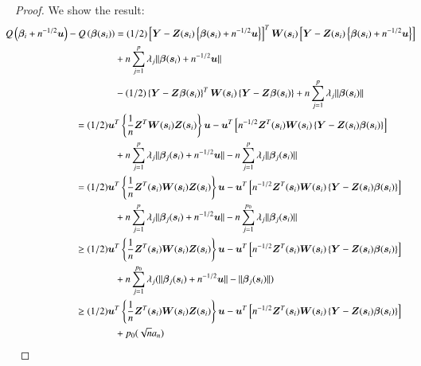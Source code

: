 \documentclass[authoryear, review, 11pt]{elsarticle}
\begin{document}
\begin{proof}
    We show the result:
    \begin{align}\label{eq:consistency}
      \mkern-18mu Q \left( \bm{\beta}_i + n^{-1/2} \bm{u} \right) - Q \left( \bm{\beta}(\bm{s}_i) \right) &= (1/2) \left[ \bm{Y} - \bm{Z}(\bm{s}_i) \left\{ \bm{\beta}(\bm{s}_i) + n^{-1/2} \bm{u} \right\} \right]^T \bm{W}(\bm{s}_i) \left[ \bm{Y} - \bm{Z}(\bm{s}_i) \left\{ \bm{\beta}(\bm{s}_i) + n^{-1/2} \bm{u} \right\} \right] \notag \\
      &+ n \sum_{j=1}^p \lambda_j \| \bm{\beta}(\bm{s}_i) + n^{-1/2} \bm{u} \| \notag \\
      &- (1/2) \left\{ \bm{Y} - \bm{Z} \bm{\beta}(\bm{s}_i) \right\}^T \bm{W}(\bm{s}_i) \left\{ \bm{Y} - \bm{Z} \bm{\beta}(\bm{s}_i) \right\} + n \sum_{j=1}^p \lambda_j \| \bm{\beta}(\bm{s}_i) \| \notag \\ 
      &\mkern-72mu= (1/2) \bm{u}^T \left\{ \frac{1}{n} \bm{Z}^T \bm{W}(\bm{s}_i) \bm{Z}(\bm{s}_i) \right\} \bm{u} - \bm{u}^T \left[ n^{-1/2} \bm{Z}^T(\bm{s}_i) \bm{W}(\bm{s}_i) \left\{ \bm{Y} - \bm{Z}(\bm{s}_i) \bm{\beta}(\bm{s}_i) \right\} \right] \notag \\
      &+ n \sum_{j=1}^p \lambda_j \|\bm{\beta}_j(\bm{s}_i) + n^{-1/2} \bm{u} \| - n \sum_{j=1}^p \lambda_j \| \bm{\beta}_j(\bm{s}_i) \| \notag \\
      &\mkern-72mu= (1/2) \bm{u}^T \left\{ \frac{1}{n} \bm{Z}^T(\bm{s}_i) \bm{W}(\bm{s}_i) \bm{Z}(\bm{s}_i) \right\} \bm{u} - \bm{u}^T \left[ n^{-1/2} \bm{Z}^T(\bm{s}_i) \bm{W}(\bm{s}_i) \left\{ \bm{Y} - \bm{Z}(\bm{s}_i) \bm{\beta}(\bm{s}_i) \right\} \right] \notag \\
      &+ n \sum_{j=1}^p \lambda_j \|\bm{\beta}_j(\bm{s}_i) + n^{-1/2} \bm{u} \| - n \sum_{j=1}^{p_0} \lambda_j \| \bm{\beta}_j(\bm{s}_i) \| \notag \\
      &\mkern-72mu\ge (1/2) \bm{u}^T \left\{ \frac{1}{n} \bm{Z}^T(\bm{s}_i) \bm{W}(\bm{s}_i) \bm{Z}(\bm{s}_i) \right\} \bm{u} - \bm{u}^T \left[ n^{-1/2} \bm{Z}^T(\bm{s}_i) \bm{W}(\bm{s}_i) \left\{ \bm{Y} - \bm{Z}(\bm{s}_i) \bm{\beta}(\bm{s}_i) \right\} \right] \notag \\
      &+ n \sum_{j=1}^{p_0} \lambda_j ( \|\bm{\beta}_j(\bm{s}_i) + n^{-1/2} \bm{u} \| - \| \bm{\beta}_j(\bm{s}_i) \| ) \notag \\
      &\mkern-72mu\ge (1/2) \bm{u}^T \left\{ \frac{1}{n} \bm{Z}^T(\bm{s}_i) \bm{W}(\bm{s}_i) \bm{Z}(\bm{s}_i) \right\} \bm{u} - \bm{u}^T \left[ n^{-1/2} \bm{Z}^T(\bm{s}_i) \bm{W}(\bm{s}_i) \left\{ \bm{Y} - \bm{Z}(\bm{s}_i) \bm{\beta}(\bm{s}_i) \right\} \right] \notag \\
      &+ p_0 ( \sqrt{n} a_n )
    \end{align}
  \end{proof}
\end{document}
